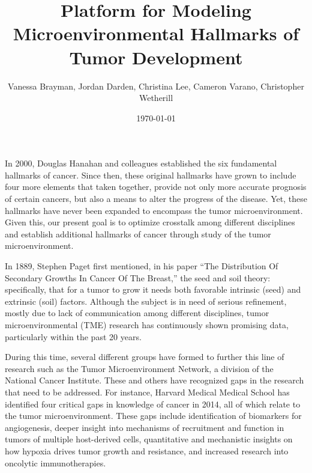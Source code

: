 \documentclass[11pt,letterpaper,final] {article}
\title{Platform for Modeling Microenvironmental Hallmarks of Tumor Development}
\author{Vanessa Brayman, Jordan Darden, Christina Lee, Cameron Varano, Christopher Wetherill}
\date{\today}
\begin{document}
\maketitle


In 2000, Douglas Hanahan and colleagues established the six fundamental hallmarks of cancer. Since then, these original hallmarks have grown to include four more elements that taken together, provide not only more accurate prognosis of certain cancers, but also a means to alter the progress of the disease. Yet, these hallmarks have never been expanded to encompass the tumor microenvironment. Given this, our present goal is to optimize crosstalk among different disciplines and establish additional hallmarks of cancer through study of the tumor microenvironment.

In 1889, Stephen Paget first mentioned, in his paper ``The Distribution Of Secondary Growths In Cancer Of The Breast,'' the seed and soil theory: specifically, that for a tumor to grow it needs both favorable intrinsic (seed) and extrinsic (soil) factors. Although the subject is in need of serious refinement, mostly due to lack of communication among different disciplines, tumor microenvironmental (TME) research has continuously shown promising data, particularly within the past 20 years.

During this time, several different groups have formed to further this line of research such as the Tumor Microenvironment Network, a division of the National Cancer Institute. These and others have recognized gaps in the research that need to be addressed. For instance, Harvard Medical Medical School has identified four critical gaps in knowledge of cancer in 2014, all of which relate to the tumor microenvironment. These gaps include identification of biomarkers for angiogenesis, deeper insight into mechanisms of recruitment and function in tumors of multiple host-derived cells, quantitative and mechanistic insights on how hypoxia drives tumor growth and resistance, and increased research into oncolytic immunotherapies.
\end{document}
